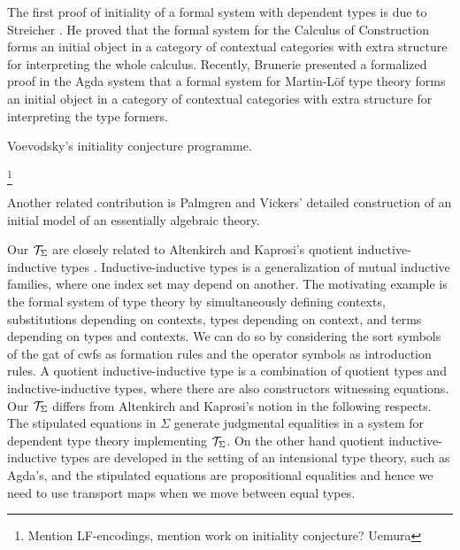 \documentclass{lmcs}
\begin{document}
The first proof of initiality of a formal system with dependent types is due to Streicher \cite{streicher:semtt}. He proved that the formal system for the Calculus of Construction forms an initial object in a category of contextual categories with extra structure for interpreting the whole calculus. Recently, Brunerie \cite{brunerie:initiality} presented a formalized proof in the Agda system that a formal system for Martin-Löf type theory forms an initial object in a category of contextual categories with extra structure for interpreting
the type formers.

Voevodsky's initiality conjecture programme.

\footnote{Mention LF-encodings, mention work on initiality conjecture? Uemura}

Another related contribution is Palmgren and Vickers' \cite{palmgrenvickers} detailed construction of 
an initial model of an essentially algebraic theory.

Our ${\mathcal T}_\Sigma$ are closely related to Altenkirch and Kaprosi's quotient inductive-inductive types \cite{altenkirch:qiits}. Inductive-inductive types \cite{nordvallforsberg:iids} is a generalization of mutual inductive families, where one index set may depend on another. The motivating example is the formal system of type theory by simultaneously defining contexts, substitutions depending on contexts, types depending on context, and terms depending on types and contexts. We can do so by considering the sort symbols of the gat of cwfs as formation rules and the operator symbols as introduction rules. A quotient inductive-inductive type is a combination of quotient types and inductive-inductive types, where there are also constructors witnessing equations. Our ${\mathcal T}_\Sigma$ differs from Altenkirch and Kaprosi's notion in the following respects. The stipulated equations in $\Sigma$ generate judgmental equalities in a system for dependent type theory implementing ${\mathcal T}_\Sigma$. On the other hand quotient inductive-inductive types are developed in the setting of an intensional type theory, such as Agda's, and the stipulated equations are propositional equalities and hence we need to use transport maps when we move between equal types. 




%
\end{document}

